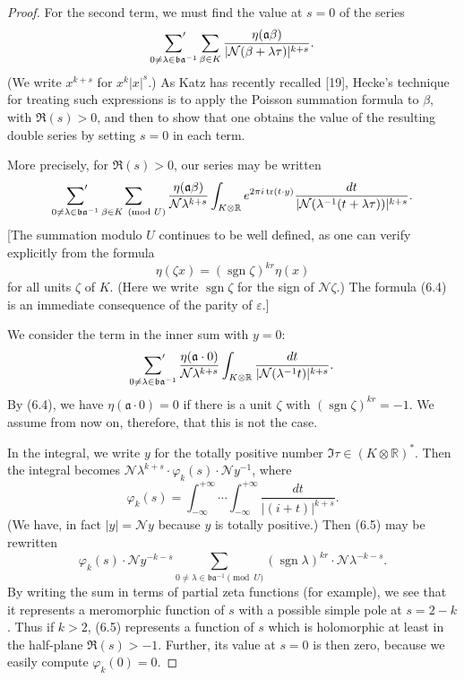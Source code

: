 \documentclass[12pt,a4paper]{article}
\theoremstyle{plain}
\theoremstyle{definition}
\theoremstyle{remark}
\DeclareMathOperator{\sgn}{sgn}
\DeclareMathOperator{\tr}{tr}
\begin{document}
\begin{proof}
For the second term, we must find the value at $s=0$ of the series
\[
\sideset{}{'}\sum_{0 \neq \lambda \in \mathfrak{b}\mathfrak{a}^{-1}} \sum_{\beta \in K} \frac{\eta(\mathfrak{a}\beta)}{|\mathcal{N}(\beta + \lambda\tau)|^{k+s}}.
\]
(We write $x^{k+s}$ for $x^k |x|^s$.) As Katz has recently recalled [19], Hecke's technique for treating such expressions is to apply the Poisson summation formula to $\beta$, with $\Re(s) > 0$, and then to show that one obtains the value of the resulting double series by setting $s=0$ in each term.

More precisely, for $\Re(s) > 0$, our series may be written
\[
\sideset{}{'}\sum_{0 \neq \lambda \in \mathfrak{b}\mathfrak{a}^{-1}} \sum_{\beta \in K \pmod{U}} \frac{\eta(\mathfrak{a}\beta)}{\mathcal{N}\lambda^{k+s}} \int_{K \otimes \mathbb{R}} e^{2\pi i \tr(t \cdot y)} \frac{dt}{|\mathcal{N}(\lambda^{-1}(t + \lambda\tau))|^{k+s}}.
\]
[The summation modulo $U$ continues to be well defined, as one can verify explicitly from the formula
\begin{equation}\label{eq:6.4}
\eta(\zeta x) = (\sgn \zeta)^{kr} \eta(x)
\end{equation}
for all units $\zeta$ of $K$. (Here we write $\sgn \zeta$ for the sign of $\mathcal{N}\zeta$.) The formula (6.4) is an immediate consequence of the parity of $\varepsilon$.]

We consider the term in the inner sum with $y = 0$:
\begin{equation}\label{eq:6.5}
\sideset{}{'}\sum_{0 \neq \lambda \in \mathfrak{b}\mathfrak{a}^{-1}} \frac{\eta(\mathfrak{a} \cdot 0)}{\mathcal{N}\lambda^{k+s}} \int_{K \otimes \mathbb{R}} \frac{dt}{|\mathcal{N}(\lambda^{-1}t)|^{k+s}}.
\end{equation}
By (6.4), we have $\eta(\mathfrak{a} \cdot 0) = 0$ if there is a unit $\zeta$ with $(\sgn \zeta)^{kr} = -1$. We assume from now on, therefore, that this is not the case.

In the integral, we write $y$ for the totally positive number $\Im\tau \in (K \otimes \mathbb{R})^*$. Then the integral becomes $\mathcal{N}\lambda^{k+s} \cdot \varphi_k(s) \cdot \mathcal{N}y^{-1}$, where
\[
\varphi_k(s) = \int_{-\infty}^{+\infty} \cdots \int_{-\infty}^{+\infty} \frac{dt}{|(i+t)|^{k+s}}.
\]
(We have, in fact $|y| = \mathcal{N}y$ because $y$ is totally positive.) Then (6.5) may be rewritten
\begin{equation}\label{eq:6.5bis}
\varphi_k(s) \cdot \mathcal{N}y^{-k-s} \sum_{0 \neq \lambda \in \mathfrak{b}\mathfrak{a}^{-1} \pmod{U}} (\sgn \lambda)^{kr} \cdot \mathcal{N}\lambda^{-k-s}.
\end{equation}
By writing the sum in terms of partial zeta functions (for example), we see that it represents a meromorphic function of $s$ with a possible simple pole at $s = 2-k$. Thus if $k > 2$, (6.5) represents a function of $s$ which is holomorphic at least in the half-plane $\Re(s) > -1$. Further, its value at $s=0$ is then zero, because we easily compute $\varphi_k(0) = 0$.


\end{proof}
\end{document}
